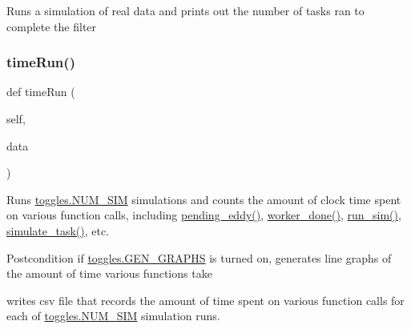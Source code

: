 \begin{DoxyVerb}Runs a simulation of real data and prints out the number of tasks
ran to complete the filter
\end{DoxyVerb}
 \mbox{\label{classdynamicfilterapp_1_1test__simulations_1_1_simulation_test_a6977d93287474dfe398931c8c0b381c3}} 
\subsubsection{\texorpdfstring{time\+Run()}{timeRun()}}
{\footnotesize\ttfamily def time\+Run (\begin{DoxyParamCaption}\item[{}]{self,  }\item[{}]{data }\end{DoxyParamCaption})}



Runs \hyperlink{namespacedynamicfilterapp_1_1toggles_a3baf5565851cd87736238d8dddfc1106}{toggles.\+N\+U\+M\+\_\+\+S\+IM} simulations and counts the amount of clock time spent on various function calls, including \hyperlink{namespacedynamicfilterapp_1_1views__helpers_ad11bcb9737901ab723493b4f7fe09329}{pending\+\_\+eddy()}, \hyperlink{namespacedynamicfilterapp_1_1views__helpers_af27860dfe5bfa6b2b8a1b29347eb918d}{worker\+\_\+done()}, \hyperlink{classdynamicfilterapp_1_1test__simulations_1_1_simulation_test_aafbc405f49645141a30302a448b056dc}{run\+\_\+sim()}, \hyperlink{classdynamicfilterapp_1_1test__simulations_1_1_simulation_test_a8bed8f0f57234f8356ce3bc19606c6bf}{simulate\+\_\+task()}, etc. 

\begin{DoxyPostcond}{Postcondition}
if \hyperlink{namespacedynamicfilterapp_1_1toggles_a57c1e3f291181d680f3ee118fa5c4ab8}{toggles.\+G\+E\+N\+\_\+\+G\+R\+A\+P\+HS} is turned on, generates line graphs of the amount of time various functions take 

writes csv file that records the amount of time spent on various function calls for each of \hyperlink{namespacedynamicfilterapp_1_1toggles_a3baf5565851cd87736238d8dddfc1106}{toggles.\+N\+U\+M\+\_\+\+S\+IM} simulation runs. 
\end{DoxyPostcond}
\mbox{\label{classdynamicfilterapp_1_1test__simulations_1_1_simulation_test_aa0a902fea4630659c86fb2964cbbd622}} 

